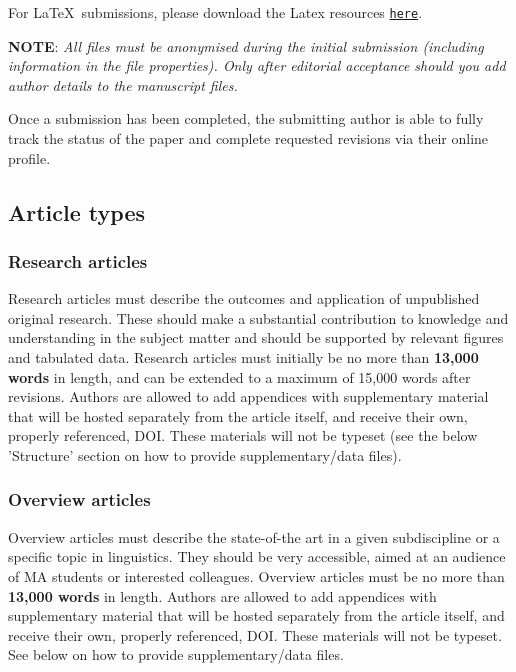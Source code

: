 \documentclass[charis,linguex]{glossa}
\begin{document}
For \LaTeX\ submissions, please download the Latex resources \href{https://github.com/guidovw/Glossalatex}{\texttt{here}}.

\textbf{NOTE}: \emph{All files must be anonymised during the initial submission (including information in the file properties). Only after editorial acceptance should you add author details to the manuscript files.}

Once a submission has been completed, the submitting author is able to fully track the status of the paper and complete requested revisions via their online profile.

\subsection{Article types}

\subsubsection{Research articles}

Research articles must describe the outcomes and application of unpublished original research. These should make a substantial contribution to knowledge and understanding in the subject matter and should be supported by relevant figures and tabulated data. Research articles must initially be no more than \textbf{13,000 words} in length, and can be extended to a maximum of 15,000 words after revisions. Authors are allowed to add appendices with supplementary material that will be hosted separately from the article itself, and receive their own, properly referenced, DOI. These materials will not be typeset (see the below 'Structure' section on how to provide supplementary/data files).

\subsubsection{Overview articles}

Overview articles must describe the state-of-the art in a given subdiscipline or a specific topic in linguistics. They should be very accessible, aimed at an audience of MA students or interested colleagues. Overview articles must be no more than \textbf{13,000 words} in length. Authors are allowed to add appendices with supplementary material that will be hosted separately from the article itself, and receive their own, properly referenced, DOI. These materials will not be typeset.  See below on how to provide supplementary/data files.
\end{document}
